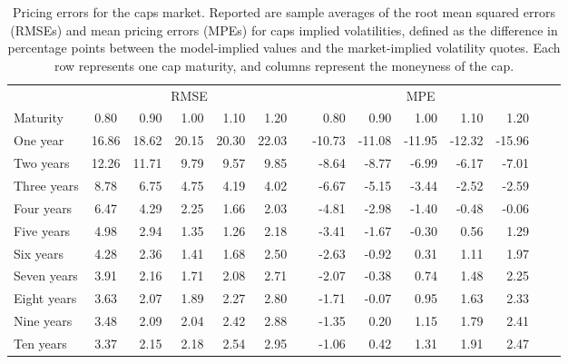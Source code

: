 \documentclass[11pt,a4paper,english,oneside]{book}
\numberwithin{equation}{chapter}
\begin{document}
\begin{table}[htbp!]
	\caption[Pricing Errors for the Caps Market]{ Pricing errors for the caps market. \label{Table2} \newline
		Reported are sample averages of the root mean squared errors (RMSEs) and mean pricing
		errors (MPEs) for caps implied volatilities, defined as the difference in percentage points between the model-implied values and the market-implied volatility quotes.
		Each row represents one cap maturity, and columns represent the moneyness of the cap.}
	\setlength{\tabcolsep}{6pt}
	\vspace{0.2cm}
	\begin{tabular}{@{}lcrrrrrrrrrrrr@{}}
		\toprule & \multicolumn{5}{c}{RMSE}
		&& \multicolumn{5}{c}{MPE} \\
		\cmidrule(r){2-6}  \cmidrule(r){8-12}
		{Maturity}  & 0.80 & 0.90 & 1.00 & 1.10 & 1.20 && 0.80 & 0.90 & 1.00 & 1.10 & 1.20 \\
		\midrule
		One year  & 16.86   &   18.62   &   20.15   &  20.30   &  22.03 & &  -10.73  & -11.08  & -11.95   &-12.32  &-15.96      \\
		Two years  & 12.26   &   11.71   &    9.79   &   9.57   &   9.85 & &   -8.64  &  -8.77  &  -6.99   & -6.17  & -7.01      \\
		Three years  &  8.78   &    6.75   &    4.75   &   4.19   &   4.02 & &   -6.67  &  -5.15  &  -3.44   & -2.52  & -2.59      \\
		Four years  &  6.47   &    4.29   &    2.25   &   1.66   &   2.03 & &   -4.81  &  -2.98  &  -1.40   & -0.48  & -0.06      \\
		Five years  &  4.98   &    2.94   &    1.35   &   1.26   &   2.18 & &   -3.41  &  -1.67  &  -0.30   &  0.56  &  1.29       \\
		Six years  &  4.28   &    2.36   &    1.41   &   1.68   &   2.50 & &   -2.63  &  -0.92  &   0.31   &  1.11  &  1.97      \\
		Seven years  &  3.91   &    2.16   &    1.71   &   2.08   &   2.71 & &   -2.07  &  -0.38  &   0.74   &  1.48  &  2.25      \\
		Eight years  &  3.63   &    2.07   &    1.89   &   2.27   &   2.80 & &   -1.71  &  -0.07  &   0.95   &  1.63  &  2.33      \\
		Nine years  &  3.48   &    2.09   &    2.04   &   2.42   &   2.88 & &   -1.35  &   0.20  &   1.15   &  1.79  &  2.41      \\
		Ten years &  3.37   &    2.15   &    2.18   &   2.54   &   2.95 & &   -1.06  &   0.42  &   1.31   &  1.91  &  2.47      \\
		\bottomrule
	\end{tabular}\\
\end{table}
\end{document}
